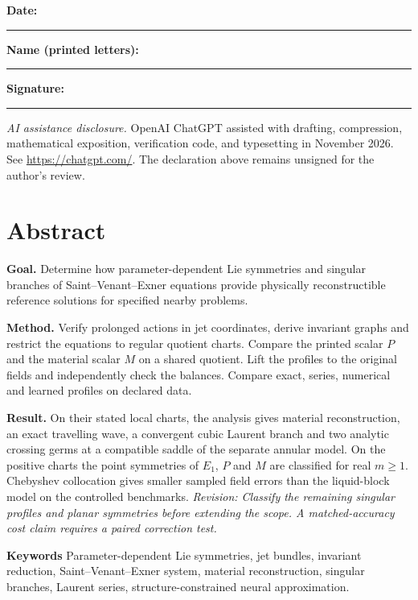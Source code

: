 \documentclass[12pt,a4paper,oneside]{report}
\newcommand{\reviewnote}[1]{\textcolor{reviewblue}{\textit{Revision: #1}}}
\numberwithin{equation}{chapter}
\theoremstyle{remark}\newtheorem{remark}[theorem]{Remark}
\begin{document}
\vspace{25mm}
\noindent\textbf{Date:} \rule[-8pt]{11.5cm}{0.1em}\par
\bigskip\bigskip
\noindent\textbf{Name (printed letters):} \rule[-8pt]{7.8cm}{0.1em}\par
\bigskip\bigskip
\noindent\textbf{Signature:} \rule[-8pt]{10.55cm}{0.1em}
\vfill
{\small\noindent\textit{AI assistance disclosure.} OpenAI ChatGPT assisted with
drafting, compression, mathematical exposition, verification code, and
typesetting in November 2026. See \url{https://chatgpt.com/}. The declaration
above remains unsigned for the author's review.}
\clearpage
\chapter*{Abstract}
\noindent\textbf{Goal.} Determine how parameter-dependent Lie symmetries and singular branches of Saint--Venant--Exner equations provide physically reconstructible reference solutions for specified nearby problems.

\medskip\noindent\textbf{Method.} Verify prolonged actions in jet coordinates, derive invariant graphs and restrict the equations to regular quotient charts. Compare the printed scalar $P$ and the material scalar $M$ on a shared quotient. Lift the profiles to the original fields and independently check the balances. Compare exact, series, numerical and learned profiles on declared data.

\medskip\noindent\textbf{Result.} On their stated local charts, the analysis gives material reconstruction, an exact travelling wave, a convergent cubic Laurent branch and two analytic crossing germs at a compatible saddle of the separate annular model. On the positive charts the point symmetries of $E_1$, $P$ and $M$ are classified for real $m\ge1$. Chebyshev collocation gives smaller sampled field errors than the liquid-block model on the controlled benchmarks. \reviewnote{Classify the remaining singular profiles and planar symmetries before extending the scope. A matched-accuracy cost claim requires a paired correction test.}

\medskip\noindent\textbf{Keywords} \quad Parameter-dependent Lie symmetries, jet bundles, invariant reduction, Saint--Venant--Exner system, material reconstruction, singular branches, Laurent series, structure-constrained neural approximation.
\clearpage
\tableofcontents
\clearpage
{}
\listoffigures
\clearpage
{}
\listoftables
\clearpage
\end{document}

